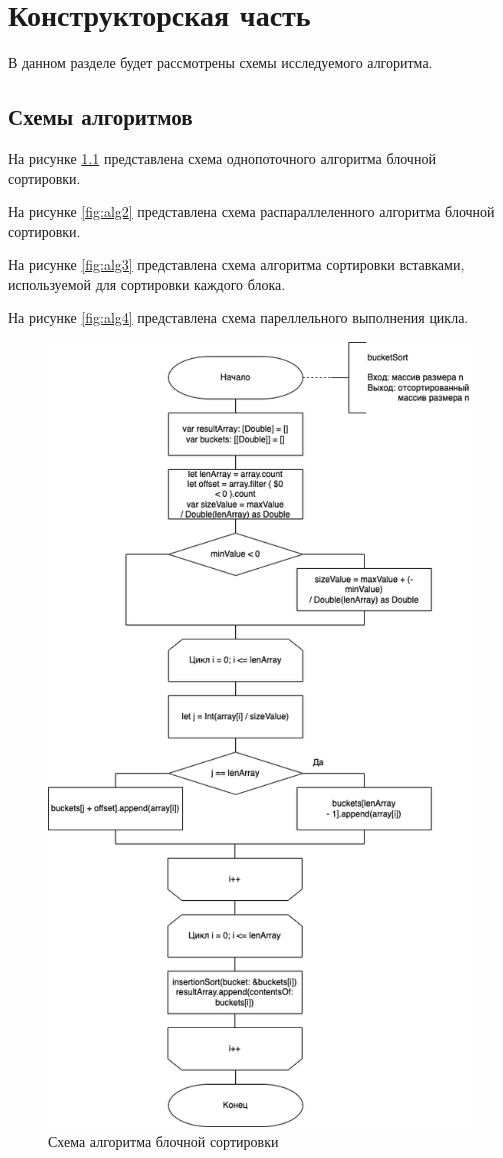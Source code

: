 \chapter{Конструкторская часть}
В данном разделе будет рассмотрены схемы исследуемого алгоритма.

\section{Схемы алгоритмов}

На рисунке \ref{fig:alg1} представлена схема однопоточного алгоритма блочной сортировки.

На рисунке \ref{fig:alg2} представлена схема распараллеленного алгоритма блочной сортировки.

На рисунке \ref{fig:alg3} представлена схема алгоритма сортировки вставками, используемой для сортировки каждого блока.

На рисунке \ref{fig:alg4} представлена схема пареллельного выполнения цикла.

\begin{figure}[h!]
	\centering
	\includegraphics[width=0.8\linewidth]{img/Bucket.png}
	\caption{Схема алгоритма блочной сортировки}
	\label{fig:alg1}
\end{figure}

